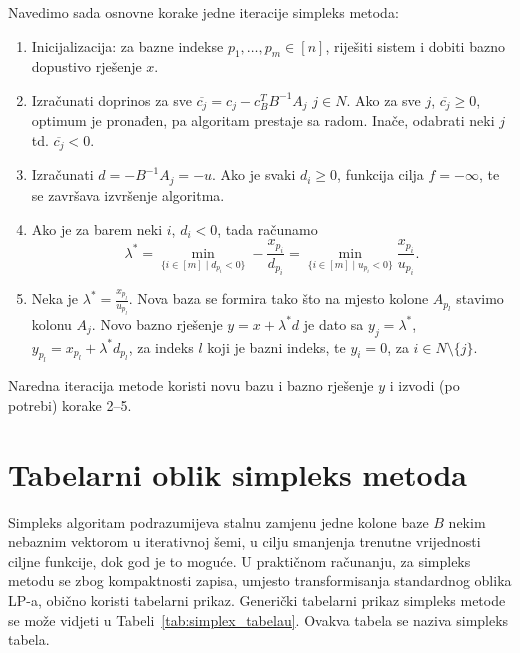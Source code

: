 \documentclass[b5paper, utf8, 11pt, colorlinks]{book}
\theoremstyle{definition}
\begin{document}
 Navedimo sada osnovne korake jedne iteracije simpleks metoda:
 \begin{enumerate}
	\item Inicijalizacija: za bazne indekse $p_1,\ldots,p_m \in [n]$, riješiti sistem i dobiti bazno dopustivo rješenje $x$. 
	\item Izračunati doprinos za sve $\overline{c_j} = c_j - c_B^T B^{-1}A_j $
	$j \in N$. Ako za sve $j$, $\overline{c_j} \geq 0$, optimum je pronađen, pa algoritam prestaje sa radom. Inače, odabrati neki $j$  td. $\overline{c_j}<0$.
	\item Izračunati $d = -B^{-1}A_j = -u$. Ako je svaki $d_i \geq  0$, funkcija cilja  $f = - \infty$, te se završava izvršenje algoritma. 
	\item Ako je za barem neki $i$, $d_i < 0$, tada računamo 
	$$ \lambda^* = \min_{ \{i\in [m] \mid d_{p_i} < 0  \}} - \frac{x_{p_i}}{d_{p_i}} =  \min_{ \{i\in [m] \mid u_{p_i} < 0  \}} \frac{x_{p_i}}{u_{p_i}}.$$
	\item Neka je $\lambda^* = \frac{x_{p_l}}{u_{p_l}}$. Nova baza se formira tako što na mjesto kolone $A_{p_l}$ stavimo kolonu $A_j$. Novo bazno rješenje 
	$y = x + \lambda^*d $ je dato sa $y_j = \lambda^*$, $y_{p_l} = x_{p_l} + \lambda^* d_{p_l}$, za indeks $l$ koji je bazni indeks, te $y_i = 0$, za $i \in N \setminus \{j\}$. 
\end{enumerate}

Naredna iteracija metode koristi novu bazu i bazno rješenje $y$ i izvodi (po potrebi) korake 2--5. 



 \section{Tabelarni oblik simpleks metoda}


 Simpleks algoritam podrazumijeva stalnu zamjenu jedne kolone baze $B$ nekim nebaznim vektorom u iterativnoj šemi, u cilju smanjenja trenutne vrijednosti ciljne funkcije, dok god je to moguće. 
 U praktičnom računanju, za simpleks metodu se zbog kompaktnosti zapisa,  umjesto transformisanja standardnog oblika LP-a, obično koristi tabelarni prikaz.
 Generički tabelarni  prikaz simpleks metode se može vidjeti u Tabeli~\ref{tab:simplex_tabelau}. Ovakva tabela se naziva  simpleks tabela.
\end{document}
